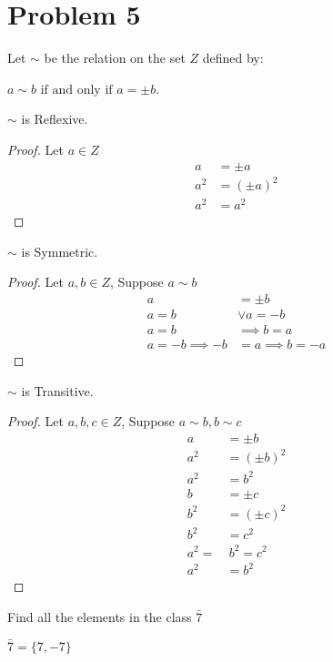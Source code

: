 \documentclass{article}
\newenvironment{problem}[1]{
  \nobreak\section*{Problem #1}
}{}
\begin{document}
  \begin{problem}{5}
    Let $\sim$ be the relation on the set $Z$ defined by:
    \begin{center}
      $a \sim b \text{ if and only if } a = \pm b$.
    \end{center}

    $\sim$ is Reflexive.
    \begin{proof}
      Let $a \in Z$
      \begin{equation*}
        \begin{split}
          a & = \pm a\\
          a^2 & = (\pm a)^2\\
          a^2 & = a^2
        \end{split}
      \end{equation*}
    \end{proof}

    $\sim$ is Symmetric.
    \begin{proof}
      Let $a, b \in Z$, Suppose $a \sim b$
      \begin{equation*}
        \begin{split}
          a & = \pm b\\
          a = b & \vee a = -b\\
          a = b & \implies b = a\\
          a = -b \implies -b & = a \implies b = -a
        \end{split}
      \end{equation*}
    \end{proof}

    $\sim$ is Transitive.
    \begin{proof}
      Let $a, b, c \in Z$, Suppose $a \sim b, b \sim c$
      \begin{equation*}
        \begin{split}
          a & = \pm b\\
          a^2 & = (\pm b)^2\\
          a^2 & = b^2\\
          b & = \pm c\\
          b^2 & = (\pm c)^2\\
          b^2 & = c^2\\
          a^2 = & ~ b^2 = c^2\\
          a^2 & = b^2
        \end{split}
      \end{equation*}
    \end{proof}

    Find all the elements in the class $\bar{7}$
    \begin{center}
      $\bar{7} = \{7, -7\}$
    \end{center}
  \end{problem}
\end{document}
